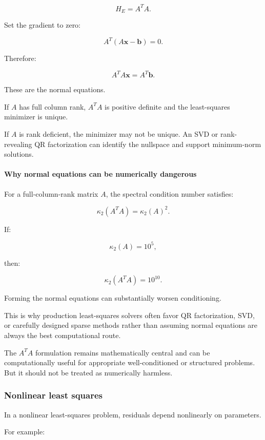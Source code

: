 \[
\boxed{H_E=A^TA}.
\]

Set the gradient to zero:

\[
A^T(A\mathbf x-\mathbf b)=0.
\]

Therefore:

\[
\boxed{A^TA\mathbf x=A^T\mathbf b}.
\]

These are the normal equations.

If \(A\) has full column rank, \(A^TA\) is positive definite and the least-squares minimizer is unique.

If \(A\) is rank deficient, the minimizer may not be unique. An SVD or rank-revealing QR factorization can identify the nullspace and support minimum-norm solutions.

\paragraph{Why normal equations can be numerically dangerous}\label{02-foundations-ii-ch026-why-normal-equations-can-be-numerically-dangerous}

For a full-column-rank matrix \(A\), the spectral condition number satisfies:

\[
\boxed{ \kappa_2(A^TA)=\kappa_2(A)^2 }.
\]

If:

\[
\kappa_2(A)=10^5,
\]

then:

\[
\kappa_2(A^TA)=10^{10}.
\]

Forming the normal equations can substantially worsen conditioning.

This is why production least-squares solvers often favor QR factorization, SVD, or carefully designed sparse methods rather than assuming normal equations are always the best computational route.

The \(A^TA\) formulation remains mathematically central and can be computationally useful for appropriate well-conditioned or structured problems. But it should not be treated as numerically harmless.

\subsubsection{Nonlinear least squares}\label{02-foundations-ii-ch026-nonlinear-least-squares}

In a nonlinear least-squares problem, residuals depend nonlinearly on parameters.

For example:

